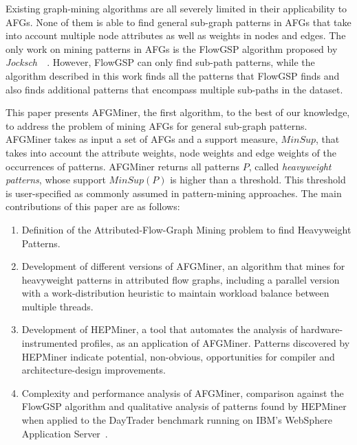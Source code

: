 Existing graph-mining algorithms are all severely limited in their applicability to AFGs. None of them is able to find general sub-graph patterns in AFGs that take into account multiple node attributes as well as weights in nodes and edges. The only work on mining patterns in AFGs is the FlowGSP algorithm proposed by \emph{Jocksch~\etal}~\cite{FlowGSP}. However, FlowGSP can only find sub-path patterns, while the algorithm described in this work finds all the patterns that FlowGSP finds and also finds additional patterns that encompass multiple sub-paths in the dataset.  

This paper presents AFGMiner, the first algorithm, to the best of our knowledge, to address the problem of mining AFGs for general sub-graph patterns. AFGMiner takes as input a set of AFGs and a support measure, ${\mathit MinSup}$, that takes into account the attribute weights, node weights and edge weights of the occurrences of patterns. AFGMiner returns all patterns $P$, called \emph{heavyweight patterns}, whose support ${\mathit MinSup}(P)$ is higher than a threshold. This threshold is user-specified as commonly assumed in pattern-mining approaches.
The main contributions of this paper are as follows: 

\begin{enumerate}
\item Definition of the Attributed-Flow-Graph Mining problem to find Heavyweight Patterns.

\item Development of different versions of AFGMiner, an algorithm that mines for heavyweight patterns in attributed flow graphs, including a parallel version with a work-distribution heuristic to maintain workload balance between multiple threads.

\item Development of HEPMiner, a tool that automates the analysis of hardware-instrumented profiles, as an application of AFGMiner. Patterns discovered by HEPMiner indicate potential, non-obvious, opportunities for compiler and architecture-design improvements.

\item Complexity and performance analysis of AFGMiner, comparison against the FlowGSP algorithm and qualitative analysis of patterns found by HEPMiner when applied to the DayTrader benchmark running on IBM's WebSphere Application Server~\cite{WAS}.
\end{enumerate} 




